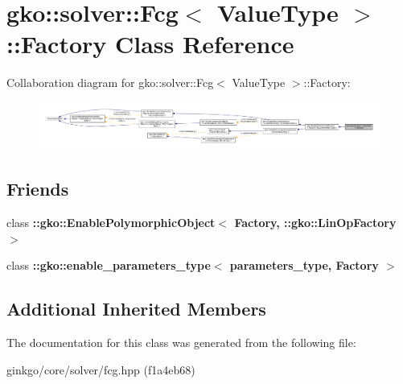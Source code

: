 \hypertarget{classgko_1_1solver_1_1Fcg_1_1Factory}{}\section{gko\+:\+:solver\+:\+:Fcg$<$ Value\+Type $>$\+:\+:Factory Class Reference}
\label{classgko_1_1solver_1_1Fcg_1_1Factory}


Collaboration diagram for gko\+:\+:solver\+:\+:Fcg$<$ Value\+Type $>$\+:\+:Factory\+:
\nopagebreak
\begin{figure}[H]
\begin{center}
\leavevmode
\includegraphics[width=350pt]{classgko_1_1solver_1_1Fcg_1_1Factory__coll__graph}
\end{center}
\end{figure}
\subsection*{Friends}
\begin{DoxyCompactItemize}
\item 
\mbox{\label{classgko_1_1solver_1_1Fcg_1_1Factory_a27e9bbc94a1c1c59f40833153eda8f78}} 
class {\bfseries \+::gko\+::\+Enable\+Polymorphic\+Object$<$ Factory, \+::gko\+::\+Lin\+Op\+Factory $>$}
\item 
\mbox{\label{classgko_1_1solver_1_1Fcg_1_1Factory_a0d176cbd42d6214e11aee8c30ca256fc}} 
class {\bfseries \+::gko\+::enable\+\_\+parameters\+\_\+type$<$ parameters\+\_\+type, Factory $>$}
\end{DoxyCompactItemize}
\subsection*{Additional Inherited Members}


The documentation for this class was generated from the following file\+:\begin{DoxyCompactItemize}
\item 
ginkgo/core/solver/fcg.\+hpp (f1a4eb68)\end{DoxyCompactItemize}
